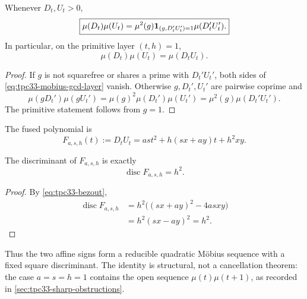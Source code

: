 \begin{proposition}
\label{prop:tpc33-mobius-gcd-layer}
Whenever \(D_t,U_t>0\),
\begin{equation}
 \boxed{
 \mu(D_t)\mu(U_t)
 =\mu^2(g)\mathbf 1_{(g,D_t'U_t')=1}\mu(D_t'U_t').}
 \label{eq:tpc33-mobius-gcd-layer}
\end{equation}
In particular, on the primitive layer \((t,h)=1\),
\begin{equation}
 \boxed{
 \mu(D_t)\mu(U_t)=\mu(D_tU_t).}
 \label{eq:tpc33-primitive-mobius-fusion}
\end{equation}
\end{proposition}

\begin{proof}
If \(g\) is not squarefree or shares a prime with \(D_t'U_t'\), both sides
of \eqref{eq:tpc33-mobius-gcd-layer} vanish.  Otherwise \(g,D_t',U_t'\)
are pairwise coprime and
\[
 \mu(gD_t')\mu(gU_t')
 =\mu(g)^2\mu(D_t')\mu(U_t')
 =\mu^2(g)\mu(D_t'U_t').
\]
The primitive statement follows from \(g=1\).
\end{proof}

The fused polynomial is
\begin{equation}
 F_{a,s,h}(t)
 :=D_tU_t
 =as t^2+h(sx+ay)t+h^2xy.
 \label{eq:tpc33-reducible-quadratic}
\end{equation}

\begin{proposition}
\label{prop:tpc33-square-discriminant}
The discriminant of \(F_{a,s,h}\) is exactly
\begin{equation}
 \boxed{\operatorname{disc}F_{a,s,h}=h^2.}
 \label{eq:tpc33-square-discriminant}
\end{equation}
\end{proposition}

\begin{proof}
By \eqref{eq:tpc33-bezout},
\begin{align*}
 \operatorname{disc}F_{a,s,h}
 &=h^2\bigl((sx+ay)^2-4asxy\bigr)\\
 &=h^2(sx-ay)^2=h^2.
\end{align*}
\end{proof}

Thus the two affine signs form a reducible quadratic M\"obius sequence with
a fixed square discriminant.  The identity is structural, not a
cancellation theorem: the case \(a=s=h=1\) contains the open sequence
\(\mu(t)\mu(t+1)\), as recorded in
\cref{sec:tpc33-sharp-obstructions}.

